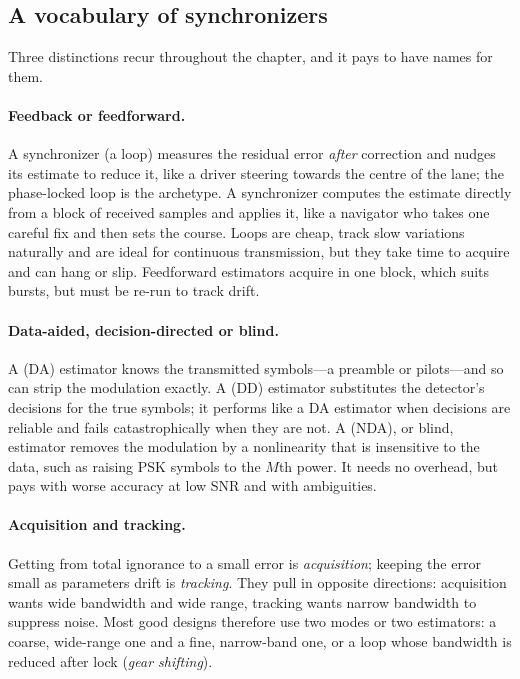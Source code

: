 \subsection{A vocabulary of synchronizers}

Three distinctions recur throughout the chapter, and it pays to have names for them.

\paragraph{Feedback or feedforward.} A  synchronizer (a loop) measures the residual
error \emph{after} correction and nudges its estimate to reduce it, like a driver steering
towards the centre of the lane; the phase-locked loop is the archetype. A 
synchronizer computes the estimate directly from a block of received samples and applies it, like
a navigator who takes one careful fix and then sets the course. Loops are cheap, track slow
variations naturally and are ideal for continuous transmission, but they take time to acquire and
can hang or slip. Feedforward estimators acquire in one block, which suits bursts, but must be
re-run to track drift.

\paragraph{Data-aided, decision-directed or blind.} A  (DA) estimator knows the
transmitted symbols---a preamble or pilots---and so can strip the modulation exactly. A
 (DD) estimator substitutes the detector's decisions for the true symbols;
it performs like a DA estimator when decisions are reliable and fails catastrophically when they are
not. A  (NDA), or blind, estimator removes the modulation by a nonlinearity that
is insensitive to the data, such as raising PSK symbols to the $M$th power. It needs no overhead,
but pays with worse accuracy at low SNR and with ambiguities.

\paragraph{Acquisition and tracking.} Getting from total ignorance to a small error is
\emph{acquisition}; keeping the error small as parameters drift is \emph{tracking}. They pull in
opposite directions: acquisition wants wide bandwidth and wide range, tracking wants narrow bandwidth
to suppress noise. Most good designs therefore use two modes or two estimators: a coarse,
wide-range one and a fine, narrow-band one, or a loop whose bandwidth is reduced after lock
(\emph{gear shifting}).

